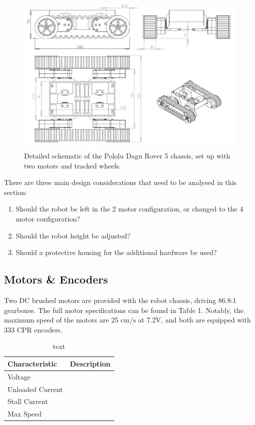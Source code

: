 \documentclass[a4paper]{article}
\begin{document}
\begin{figure}[h]
\centering
\includegraphics[scale=0.3]{fig1}
\caption{Detailed schematic of the Pololu Dagu Rover 5 chassis, set up with two motors and tracked wheels.}
\end{figure}


There are three main design considerations that need to be analysed in this section:
\begin{enumerate}
\item Should the robot be left in the 2 motor configuration, or changed to the 4 motor configuration? 
\item Should the robot height be adjusted?
\item Should a protective housing for the additional hardware be used?
\end{enumerate}



\subsection{Motors \& Encoders}
Two DC brushed motors are provided with the robot chassis, driving 86.8:1 gearboxes. The full motor specifications can be found in Table 1. Notably, the maximum speed of the motors are 25 $\si{\centi\meter\per\second}$ at 7.2$\si{\volt}$, and both are equipped with 333 CPR encoders.

\begin{table}[h]
\centering
\caption{text}
\footnotesize\begin{tabular}{lp{10cm}}
\toprule
\textbf{Characteristic} & \textbf{Description}\\
\midrule
Voltage & \\
Unloaded Current & \\
Stall Current & \\
Max Speed & \\
\bottomrule
\end{tabular}
\end{table}
\end{document}
